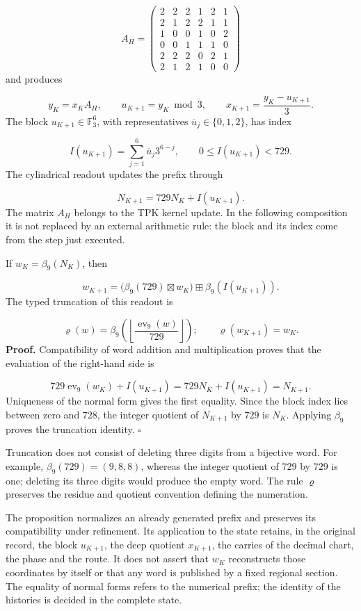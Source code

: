 \[
A_H=
\begin{pmatrix}
2&2&2&1&2&1\\
2&1&2&2&1&1\\
1&0&0&1&0&2\\
0&0&1&1&1&0\\
2&2&2&0&2&1\\
2&1&2&1&0&0
\end{pmatrix}
\]
and produces

\[
y_K=x_KA_H,\qquad
u_{K+1}=y_K\bmod3,\qquad
x_{K+1}=\frac{y_K-u_{K+1}}3.
\]
The block \(u_{K+1}\in\mathbb F_3^6\), with representatives \(\overline u_j\in\{0,1,2\}\), has index

\[
I(u_{K+1})=\sum_{j=1}^{6}\overline u_j3^{6-j},
\qquad 0\leq I(u_{K+1})<729.
\]
The cylindrical readout updates the prefix through

\[
N_{K+1}=729N_K+I(u_{K+1}).
\]
The matrix \(A_H\) belongs to the TPK kernel update. In the following composition it is not replaced by an external arithmetic rule: the block and its index come from the step just executed.

If \(w_K=\beta_9(N_K)\), then

\[
w_{K+1}
=\bigl(\beta_9(729)\boxtimes w_K\bigr)
\boxplus\beta_9(I(u_{K+1})).
\]
The typed truncation of this readout is

\[
\varrho(w)=
\beta_9\!\left(
\left\lfloor\frac{\operatorname{ev}_9(w)}{729}\right\rfloor
\right);
\qquad \varrho(w_{K+1})=w_K.
\]
\textbf{Proof.} Compatibility of word addition and multiplication proves that the evaluation of the right-hand side is

\[
729\operatorname{ev}_9(w_K)+I(u_{K+1})
=729N_K+I(u_{K+1})=N_{K+1}.
\]
Uniqueness of the normal form gives the first equality. Since the block index lies between zero and \(728\), the integer quotient of \(N_{K+1}\) by \(729\) is \(N_K\). Applying \(\beta_9\) proves the truncation identity. \hfill\(\square\)

Truncation does not consist of deleting three digits from a bijective word. For example, \(\beta_9(729)=(9,8,8)\), whereas the integer quotient of \(729\) by \(729\) is one; deleting its three digits would produce the empty word. The rule \(\varrho\) preserves the residue and quotient convention defining the numeration.

The proposition normalizes an already generated prefix and preserves its compatibility under refinement. Its application to the state retains, in the original record, the block \(u_{K+1}\), the deep quotient \(x_{K+1}\), the carries of the decimal chart, the phase and the route. It does not assert that \(w_K\) reconstructs those coordinates by itself or that any word is published by a fixed regional section. The equality of normal forms refers to the numerical prefix; the identity of the histories is decided in the complete state.

